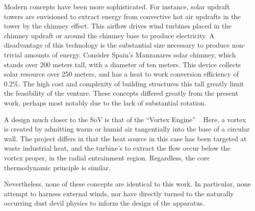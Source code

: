 %
%
Modern concepts have been more sophisticated. For instance, solar
updraft towers are envisioned to extract energy from convective hot air
updrafts in the tower by the chimney effect. This airflow drives wind
turbines placed in the chimney updraft or around the chimney base to
produce electricity. A disadvantage of this technology is the
substantial size necessary to produce non-trivial amounts of energy. 
%
%
Consider Spain's Manzanares solar chimney, which stands over 200 meters
tall, with a diameter of ten meters. This device collects solar
resource over 250 meters, and has a heat to work conversion efficiency
of 0.2\%\cite{schlaich2005design}. The high cost and complexity of
building structures this tall greatly limit the feasibility of the
venture.  
These concepts differed greatly from the present work, perhaps most
notably due to the lack of substantial rotation. 

%
%
A design much closer to the SoV is that of the ``Vortex
Engine''~\cite{vortex_engine,michaud2006atmospheric}. Here, a vortex is
created by admitting warm or humid air tangentially into the base of a
circular wall. The project differs in that the heat source in this case
has been targeted at waste industrial heat, and the turbine's to extract
the flow occur below the vortex proper, in the radial entrainment
region. Regardless, the core thermodynamic principle is similar.  

Nevertheless, none of these concepts are identical to this work. In
particular, none attempt to harness external winds, nor have directly
turned to the naturally occurring dust devil physics to inform the
design of the apparatus.  

%
%
%
%
%
%
%
%

